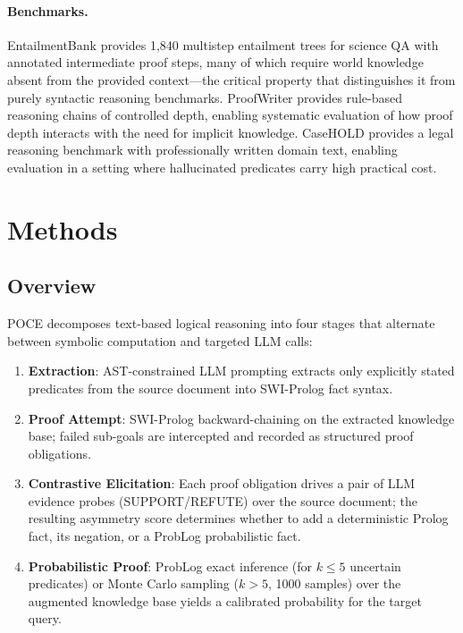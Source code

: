 \documentclass[11pt,letterpaper]{article}
\begin{document}
\paragraph{Benchmarks.}
EntailmentBank \citep{Dalvi2021} provides 1,840 multistep entailment trees for science QA with annotated intermediate proof steps, many
of which require world knowledge absent from the provided context---the critical property that distinguishes it from purely
syntactic reasoning benchmarks. ProofWriter \citep{Tafjord2020} provides rule-based reasoning chains of controlled depth, enabling systematic
evaluation of how proof depth interacts with the need for implicit knowledge. CaseHOLD \citep{Zheng2021} provides a legal reasoning
benchmark with professionally written domain text, enabling evaluation in a setting where hallucinated predicates carry
high practical cost.

\section{Methods}
\label{sec:methods}

\subsection{Overview}

POCE decomposes text-based logical reasoning into four stages that
alternate between symbolic computation and targeted LLM calls:

\begin{enumerate}
  \item \textbf{Extraction}: AST-constrained LLM prompting extracts only explicitly stated predicates from the source document into SWI-Prolog fact syntax.
  \item \textbf{Proof Attempt}: SWI-Prolog backward-chaining on the extracted knowledge base; failed sub-goals are intercepted and recorded as structured proof obligations.
  \item \textbf{Contrastive Elicitation}: Each proof obligation drives a pair of LLM evidence probes (SUPPORT/REFUTE) over the source document; the resulting asymmetry score determines whether to add a deterministic Prolog fact, its negation, or a ProbLog probabilistic fact.
  \item \textbf{Probabilistic Proof}: ProbLog exact inference (for $k \leq 5$ uncertain predicates) or Monte Carlo sampling ($k > 5$, 1000 samples) over the augmented knowledge base yields a calibrated probability for the target query.
\end{enumerate}
\end{document}
